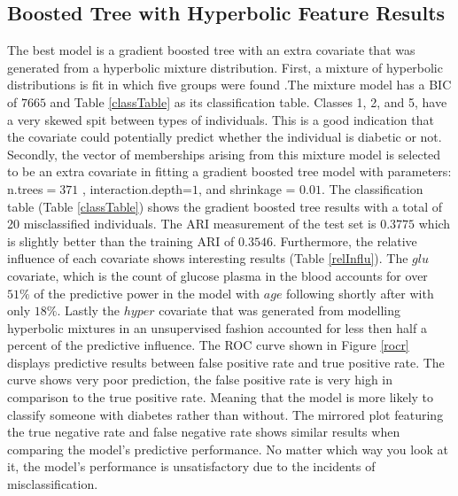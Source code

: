\documentclass[11pt,letterpaper]{article}
\begin{document}
\subsection{Boosted Tree with Hyperbolic Feature Results}

The best model is a gradient boosted tree with an extra covariate that was generated from a hyperbolic mixture distribution. First, a mixture of hyperbolic distributions is fit in which five groups were found .The mixture model has a BIC of  $7665$ and Table \ref{classTable} as its classification table. Classes 1, 2, and 5, have a very skewed spit between types of individuals. This is a good indication that the covariate could potentially predict whether the individual is diabetic or not. Secondly, the vector of memberships arising from this mixture model is selected to be an extra covariate in fitting a gradient boosted tree model with parameters:  n.trees$=371$ ,
                 interaction.depth=$1$, and
                 shrinkage = $0.01$. The classification table (Table \ref{classTable}) shows the gradient boosted tree results with a total of 20 misclassified individuals.  The ARI measurement of the test set is $0.3775$ which is slightly better than the training ARI of $0.3546$. Furthermore, the relative influence of each covariate shows interesting results (Table \ref{relInflu}). The $glu$ covariate, which is the count of glucose plasma in the blood accounts for over $51 \%$ of the predictive power in the model with $age$ following shortly after with only $18\%$. Lastly the $hyper$ covariate that was generated from modelling hyperbolic mixtures in an unsupervised fashion accounted for less then half a percent of the predictive influence. The ROC curve shown in Figure \ref{rocr} displays predictive results between false positive rate and true positive rate. The curve shows very poor prediction, the false positive rate is very high in comparison to the true positive rate. Meaning that the model is more likely to classify someone with diabetes rather than without. The mirrored plot featuring the true negative rate and false negative rate shows similar results when comparing the model's predictive performance. No matter which way you look at it, the model's performance is unsatisfactory due to the incidents of misclassification. 
\end{document}
